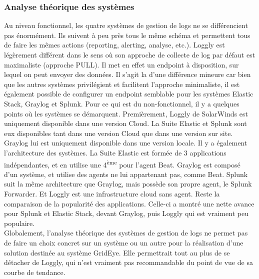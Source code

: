 \documentclass[paper=a4, fontsize=11pt]{scrartcl}
\newcommand{\ts}{\textsuperscript} %
\begin{document}
\subsubsection{Analyse théorique des systèmes}
Au niveau fonctionnel, les quatre systèmes de gestion de logs ne se différencient pas énormément. Ils suivent à peu près tous le même schéma et permettent tous de faire les mêmes actions (reporting, alerting, analyse, etc.). Loggly est légèrement différent dans le sens où son approche de collecte de log par défaut est maximaliste (approche PULL). Il met en effet un endpoint à disposition, sur lequel on peut envoyer des données. Il s'agit la d'une différence mineure car bien que les autres systèmes privilégient et facilitent l'approche minimaliste, il est également possible de configurer un endpoint semblable pour les systèmes Elastic Stack, Graylog et Splunk.
Pour ce qui est du non-fonctionnel, il y a quelques points où les systèmes se démarquent. Premièrement, Loggly de SolarWinds est uniquement disponible dans une version Cloud. La Suite Elastic et Splunk sont eux disponibles tant dans une version Cloud que dans une version sur site. Graylog lui est uniquement disponible dans une version locale. Il y a également l'architecture des systèmes. La Suite Elastic est formée de 3 applications indépendantes, et en utilise une 4\ts{ème} pour l'agent Beat. Graylog est composé d'un système, et utilise des agents ne lui appartenant pas, comme Beat. Splunk suit la même architecture que Graylog, mais possède son propre agent, le Splunk Forwarder. Et Loggly est une infrastructure cloud sans agent.
Reste la comparaison de la popularité des applications. Celle-ci a montré une nette avance pour Splunk et Elastic Stack, devant Graylog, puis Loggly qui est vraiment peu populaire. \\
Globalement, l'analyse théorique des systèmes de gestion de logs ne permet pas de faire un choix concret sur un système ou un autre pour la réalisation d'une solution destinée au système GridEye. Elle permettrait tout au plus de se détacher de Loggly, qui n'est vraiment pas recommandable du point de vue de sa courbe de tendance.
\end{document}
